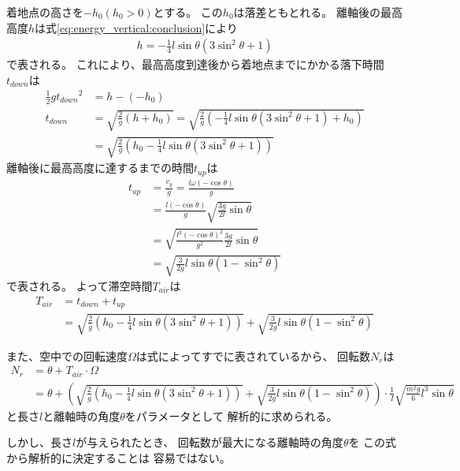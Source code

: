 \documentclass[a4paper,11pt]{jsarticle}
\begin{document}
着地点の高さを$-h_0 (h_0>0)$とする。
この$h_0$は落差ともとれる。
離軸後の最高高度$h$は式\ref{eq:energy_vertical:conclusion}により
\begin{align}
  h = -\frac{1}{4}l\sin\theta (3\sin^2\theta+1)
\end{align}
で表される。
これにより、最高高度到達後から着地点までにかかる落下時間$t_{down}$は
\begin{align}
  \frac{1}{2}g{t_{down}}^2
  &= h - (-h_0)
  \\
  t_{down}
  &= \sqrt{ \frac{2}{g} (h + h_0)}
  = \sqrt{ \frac{2}{g} \left( -\frac{1}{4}l\sin\theta (3\sin^2\theta+1) + h_0 \right) }
  \\
  & = \sqrt{ \frac{2}{g} \left( h_0 - \frac{1}{4}l\sin\theta (3\sin^2\theta+1) \right) }
\end{align}
離軸後に最高高度に達するまでの時間$t_{up}$は
\begin{align}
  t_{up} 
  &= \frac{v_y}{g} = \frac{l\omega(-\cos\theta)}{g}
  \\
  &= \frac{l(-\cos\theta)}{g} \sqrt{ \frac{3g}{2l} \sin\theta }
  \\
  &= \sqrt{ \frac{l^2(-\cos\theta)^2}{g^2} \frac{3g}{2l} \sin\theta }
  \\
  &= \sqrt{ \frac{3}{2g} l\sin\theta (1-\sin^2\theta) }
\end{align}
で表される。
よって滞空時間$T_{air}$は
\begin{align}
  T_{air} 
  &= t_{down} + t_{up}
  \\
  &= \sqrt{ \frac{2}{g} \left( h_0 - \frac{1}{4}l\sin\theta (3\sin^2\theta+1) \right) }
  + \sqrt{ \frac{3}{2g} l\sin\theta (1-\sin^2\theta) }
\end{align}

また、空中での回転速度$\Omega$は式\label{eq:Omega}によってすでに表されているから、
回転数$N_r$は
\begin{align}
  N_r 
  &= \theta + T_{air} \cdot \Omega
  \\
  &= \theta + 
  \left( \sqrt{ \frac{2}{g} \left( h_0 - \frac{1}{4}l\sin\theta (3\sin^2\theta+1) \right) }
    + \sqrt{ \frac{3}{2g} l\sin\theta (1-\sin^2\theta) } 
  \right)
  \cdot
  \frac{1}{I} \sqrt{ \frac{m^2 g}{6} l^3 \sin\theta }
  \label{eq:spin_number_conclusion}
\end{align}
と長さ$l$と離軸時の角度$\theta$をパラメータとして
解析的に求められる。

しかし、長さ$l$が与えられたとき、
回転数が最大になる離軸時の角度$\theta$を
この式から解析的に決定することは
容易ではない。
\end{document}
